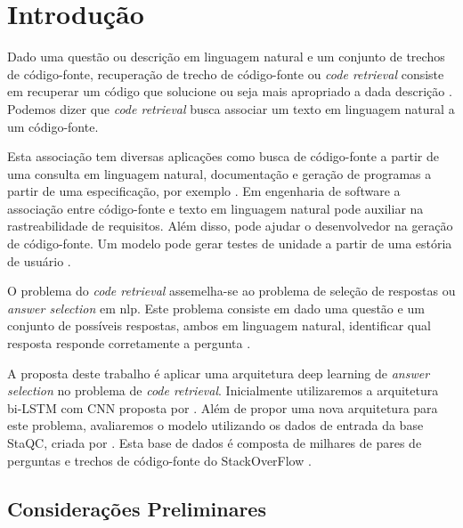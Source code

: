 \chapter{Introdução}
\label{cap:introducao}

Dado uma questão ou descrição em linguagem natural e um conjunto de trechos de código-fonte, recuperação de trecho de código-fonte ou \textit{code retrieval} consiste em recuperar um código que solucione ou seja mais apropriado a dada descrição \citep{Allamanis-bimodal-source-code-natural-language:2015}. Podemos dizer que \textit{code retrieval} busca associar um texto em linguagem natural a um código-fonte. 

Esta associação tem diversas aplicações como busca de código-fonte a partir de uma consulta em linguagem natural, documentação e geração de programas a partir de uma especificação, por exemplo \citep{Allamanis:2018:SML}. Em engenharia de software a associação entre código-fonte e texto em linguagem natural pode auxiliar na rastreabilidade de requisitos. Além disso, pode ajudar o desenvolvedor na geração de código-fonte. Um modelo pode gerar testes de unidade a partir de uma estória de usuário .

O problema do \textit{code retrieval} assemelha-se ao problema de seleção de respostas ou \textit{answer selection} em \acrshort{nlp}. Este problema consiste em dado uma questão e um conjunto de possíveis respostas, ambos em linguagem natural, identificar qual resposta responde corretamente a pergunta \citep{lai-etal-2018-review}. 

A proposta deste trabalho é aplicar uma arquitetura deep learning de \textit{answer selection} no problema de \textit{code retrieval}. Inicialmente utilizaremos a arquitetura bi-LSTM com CNN proposta por \cite{tan-lstm-qa}. Além de propor uma nova arquitetura para este problema, avaliaremos o modelo utilizando os dados de entrada da base StaQC, criada por \cite{yao-2018}. Esta base de dados é composta de milhares de pares de perguntas e trechos de código-fonte do StackOverFlow .



\section{Considerações Preliminares}
\label{sec:consideracoes_preliminares}

